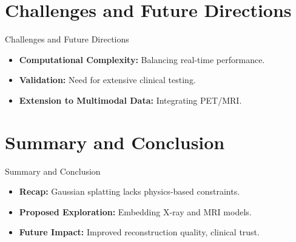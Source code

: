 \documentclass{beamer}
\begin{document}
\section{Challenges and Future Directions}
\begin{frame}{Challenges and Future Directions}
    \begin{itemize}
        \item \textbf{Computational Complexity:} Balancing real-time performance.
        \item \textbf{Validation:} Need for extensive clinical testing.
        \item \textbf{Extension to Multimodal Data:} Integrating PET/MRI.
    \end{itemize}
\end{frame}

\section{Summary and Conclusion}
\begin{frame}{Summary and Conclusion}
    \begin{itemize}
        \item \textbf{Recap:} Gaussian splatting lacks physics-based constraints.
        \item \textbf{Proposed Exploration:} Embedding X-ray and MRI models.
        \item \textbf{Future Impact:} Improved reconstruction quality, clinical trust.
    \end{itemize}
\end{frame}
\end{document}
